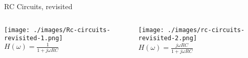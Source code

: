     \begin{frame}{RC Circuits, revisited}
        \begin{columns}
            \begin{column}{0.5\textwidth}
                \texttt{[image: ./images/Rc-circuits-revisited-1.png]}\\
                $H(\omega) = \frac{1}{1 + j\omega RC}$
            \end{column}
            \begin{column}{0.5\textwidth}
                \texttt{[image: ./images/rc-circuits-revisited-2.png]}\\
                $H(\omega) = \frac{j\omega RC}{1 + j\omega RC}$
            \end{column}
            
        \end{columns}
    \end{frame}
